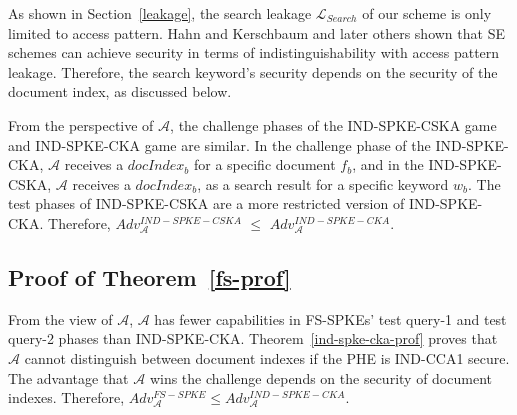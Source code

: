 \documentclass[sigconf,pdftex]{acmart}
\begin{document}
As shown in Section~\ref{leakage}, the search leakage $\mathcal{L}_{Search}$ of our scheme is only limited to access pattern. Hahn and Kerschbaum \cite{hahn2014searchable} and later others \cite{sun2018practical, kim2017forward} shown that SE schemes can achieve security in terms of indistinguishability with access pattern leakage. Therefore, the search keyword's security depends on the security of the document index, as discussed below.


From the perspective of $\mathcal{A}$, the challenge phases of the IND-SPKE-CSKA game and IND-SPKE-CKA game are similar. In the challenge phase of the IND-SPKE-CKA, $\mathcal{A}$ receives a $docIndex_b$ for a specific document $f_b$, and in the IND-SPKE-CSKA, $\mathcal{A}$ receives a $docIndex_b$, as a search result for a specific keyword $w_b$. The test phases of IND-SPKE-CSKA are a more restricted version of IND-SPKE-CKA. Therefore, $Adv_{\mathcal{A}}^{IND-SPKE-CSKA}$ $\leq$ $Adv_{\mathcal{A}}^{IND-SPKE-CKA}$.



\subsection{Proof of Theorem~\ref{fs-prof}}\label{app-fs-prof}

From the view of $\mathcal{A}$, $\mathcal{A}$ has fewer capabilities in FS-SPKEs' test query-1 and test query-2 phases than IND-SPKE-CKA. Theorem~\ref{ind-spke-cka-prof} proves that $\mathcal{A}$ cannot distinguish between document indexes if the PHE is IND-CCA1 secure. The advantage that $\mathcal{A}$ wins the challenge depends on the security of document indexes. Therefore, $Adv_{\mathcal{A}}^{FS-SPKE} \leq Adv_{\mathcal{A}}^{IND-SPKE-CKA}$.


\newpage
\end{document}
